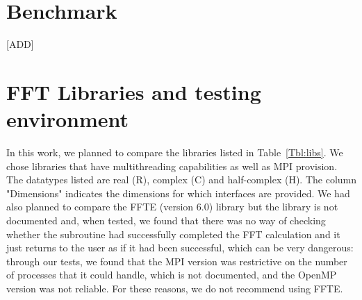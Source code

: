 \documentclass[a4paper]{article}
\begin{document}
\section{Benchmark}\label{Sec:Benchmark}


[ADD]


\section{FFT Libraries and testing environment}\label{Sec:libs}

In this work, we planned to compare the libraries listed in
Table~\ref{Tbl:libs}. We chose libraries that have multithreading
capabilities as well as MPI provision.  The datatypes listed are real
(R), complex (C) and half-complex (H). The column "Dimensions"
indicates the dimensions for which interfaces are provided.  We had
also planned to compare the FFTE (version 6.0) library but the library
is not documented and, when tested, we found that there was no way of
checking whether the subroutine had successfully completed the FFT
calculation and it just returns to the user as if it had been
successful, which can be very dangerous: through our tests, we found
that the MPI version was restrictive on the number of processes that
it could handle, which is not documented, and the OpenMP version was
not reliable. For these reasons, we do not recommend using FFTE.
\end{document}
